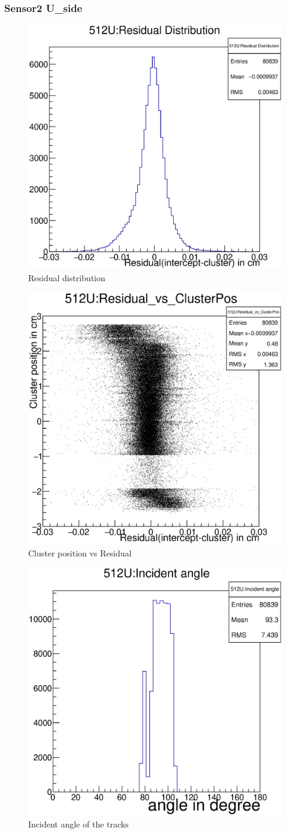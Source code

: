 \documentclass[12pt]{article}
\begin{document}
				\subsubsection{Sensor2 U\_side}
				\begin{multicols}{3}
					
					\begin{figure}[H]
						\includegraphics[width=.3\textwidth]{512U:residualplot.eps}	
						\caption{Residual distribution}	
						\label{fig1}	
					\end{figure}
					\begin{figure}[H]
						\includegraphics[width=.3\textwidth]{512U:residual_vs_clusterpos.eps}	
						\caption{Cluster position vs Residual}	
						\label{fig2}	
					\end{figure}
					\begin{figure}[H]
						\includegraphics[width=.3\textwidth]{512U:incident_angle.eps}	
						\caption{Incident angle of the tracks}	
						\label{fig2}	
					\end{figure}
				\end{multicols}
				
\end{document}
